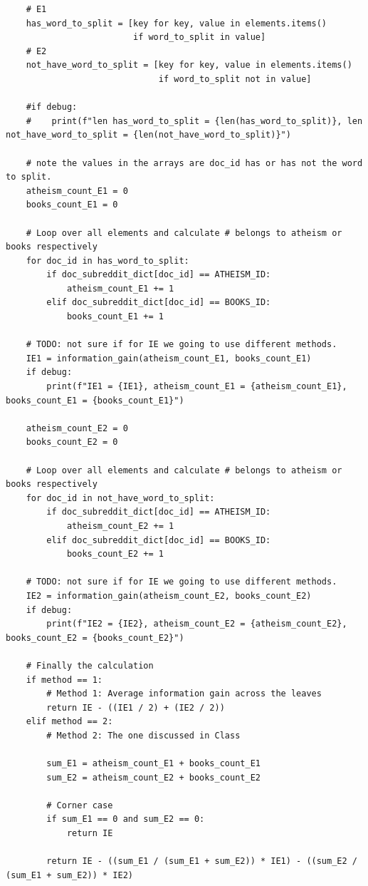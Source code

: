 \documentclass[10pt]{article}
\begin{document}
\begin{enumerate}
\begin{lstlisting}
    # E1
    has_word_to_split = [key for key, value in elements.items() 
                         if word_to_split in value]
    # E2
    not_have_word_to_split = [key for key, value in elements.items() 
                              if word_to_split not in value]
    
    #if debug:
    #    print(f"len has_word_to_split = {len(has_word_to_split)}, len not_have_word_to_split = {len(not_have_word_to_split)}")
    
    # note the values in the arrays are doc_id has or has not the word to split.
    atheism_count_E1 = 0
    books_count_E1 = 0
    
    # Loop over all elements and calculate # belongs to atheism or books respectively
    for doc_id in has_word_to_split:
        if doc_subreddit_dict[doc_id] == ATHEISM_ID:
            atheism_count_E1 += 1
        elif doc_subreddit_dict[doc_id] == BOOKS_ID:
            books_count_E1 += 1
            
    # TODO: not sure if for IE we going to use different methods.
    IE1 = information_gain(atheism_count_E1, books_count_E1)
    if debug:
        print(f"IE1 = {IE1}, atheism_count_E1 = {atheism_count_E1}, books_count_E1 = {books_count_E1}")
    
    atheism_count_E2 = 0
    books_count_E2 = 0
    
    # Loop over all elements and calculate # belongs to atheism or books respectively
    for doc_id in not_have_word_to_split:
        if doc_subreddit_dict[doc_id] == ATHEISM_ID:
            atheism_count_E2 += 1
        elif doc_subreddit_dict[doc_id] == BOOKS_ID:
            books_count_E2 += 1
    
    # TODO: not sure if for IE we going to use different methods.
    IE2 = information_gain(atheism_count_E2, books_count_E2)
    if debug:
        print(f"IE2 = {IE2}, atheism_count_E2 = {atheism_count_E2}, books_count_E2 = {books_count_E2}")
    
    # Finally the calculation
    if method == 1:
        # Method 1: Average information gain across the leaves
        return IE - ((IE1 / 2) + (IE2 / 2))
    elif method == 2:
        # Method 2: The one discussed in Class
        
        sum_E1 = atheism_count_E1 + books_count_E1
        sum_E2 = atheism_count_E2 + books_count_E2
    
        # Corner case
        if sum_E1 == 0 and sum_E2 == 0:
            return IE
        
        return IE - ((sum_E1 / (sum_E1 + sum_E2)) * IE1) - ((sum_E2 / (sum_E1 + sum_E2)) * IE2)


\end{lstlisting}
\end{enumerate}
\end{document}
